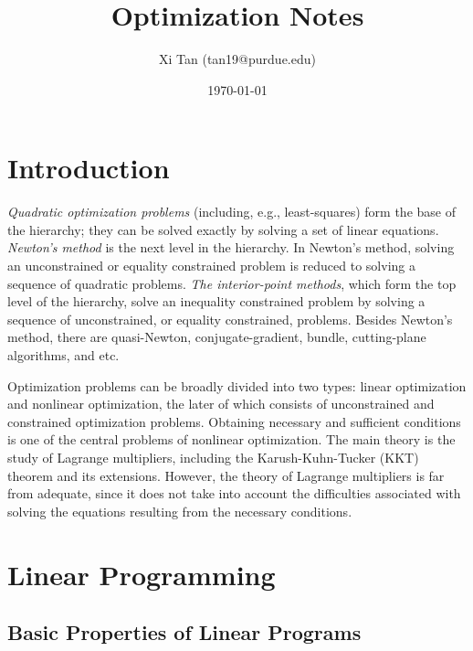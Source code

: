 \documentclass{memoir}
\title{Optimization Notes}
\author{Xi Tan (tan19@purdue.edu)}
\date{\today}
\begin{document}
\maketitle
\tableofcontents

\chapter{Introduction}
{\em{Quadratic optimization problems}} (including, e.g., least-squares) form the base of the hierarchy; they can be solved exactly by solving a set of linear equations. {\em{Newton's method}} is the next level in the hierarchy. In Newton's method, solving an unconstrained or equality constrained problem is reduced to solving a sequence of quadratic problems. {\em{The interior-point methods}}, which form the top level of the hierarchy, solve an inequality constrained problem by solving a sequence of unconstrained, or equality constrained, problems. Besides Newton's method, there are quasi-Newton, conjugate-gradient, bundle, cutting-plane algorithms, and etc.

Optimization problems can be broadly divided into two types: linear optimization and nonlinear optimization,  the later of which consists of unconstrained and constrained optimization problems. Obtaining necessary and sufficient conditions is one of the central problems of nonlinear optimization. The main theory is the study of Lagrange multipliers, including the Karush-Kuhn-Tucker (KKT) theorem and its extensions. However, the theory of Lagrange multipliers is far from adequate, since it does not take into account the difficulties associated with solving the equations resulting from the necessary conditions.


\chapter{Linear Programming}
\section{Basic Properties of Linear Programs}
\end{document}

